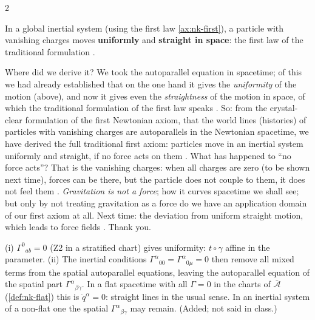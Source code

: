 \begin{paracol}{2}
\begin{theorem}\label{thm:nk-first-traditional}
In a global inertial system (using the first law \ref{ax:nk-first}), a particle with vanishing charges moves \textbf{uniformly} and \textbf{straight in space}: the first law of the traditional formulation .
\end{theorem}
Where did we derive it? We took the autoparallel equation in spacetime; of this we had already established that on the one hand it gives the \emph{uniformity} of the motion (above), and now it gives even the \emph{straightness} of the motion in space,
of which the traditional formulation of the first law speaks . So: from the crystal-clear formulation of the first Newtonian axiom, that the world lines (histories) of particles with vanishing charges are autoparallels in the
Newtonian spacetime, we have derived the full traditional first axiom: particles move in an inertial system uniformly and straight, if no force acts on them . What has happened to ``no force acts''? That is
the vanishing charges: when all charges are zero (to be shown next time), forces can be there, but the particle does not couple to them, it does not feel them .
\emph{Gravitation is not a force}; how it curves spacetime we shall see; but only by not treating gravitation as a force do we have an application domain of our first axiom at all. Next time: the deviation from uniform
straight motion, which leads to force fields . Thank you.

\begin{coursenote}
(i) $\Gamma^0{}_{ab}=0$ (Z2 in a stratified chart) gives uniformity: $t\circ\gamma$ affine in the parameter. (ii) The inertial conditions $\Gamma^\alpha{}_{00}=\Gamma^\alpha{}_{0\mu}=0$ then remove all mixed terms from the spatial autoparallel
equations, leaving the autoparallel equation of the spatial part $\Gamma^\alpha{}_{\beta\gamma}$. In a flat spacetime with all $\Gamma=0$ in the charts of $\bar{\mathcal A}$ (\cref{def:nk-flat}) this is $\ddot q^\alpha=0$: straight lines in the usual sense. In an inertial
system of a non-flat one the spatial $\Gamma^\alpha{}_{\beta\gamma}$ may remain. (Added; not said in class.)
\end{coursenote}


\end{paracol}
